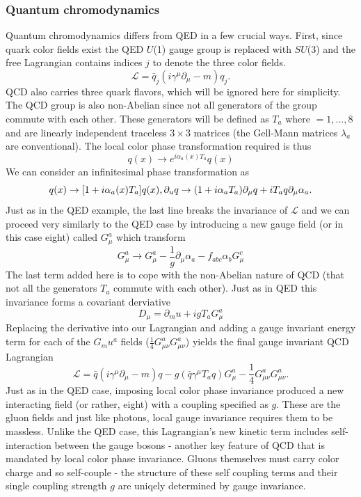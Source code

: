 \subsubsection{Quantum chromodynamics}
Quantum chromodynamics differs from QED in a few crucial ways. First, since quark color fields exist the QED $U$(1) gauge group is replaced with $SU$(3) and the free Lagrangian contains indices $j$ to denote the three color fields. 
\begin{equation}
\mathcal{L} = \bar{q}_j(i\gamma^\mu\partial_\mu - m)q_j.
\end{equation}
QCD also carries three quark flavors, which will be ignored here for simplicity. The QCD group is also non-Abelian since not all generators of the group commute with each other. These generators will be defined as $T_a$ where $=1,...,8$ and are linearly independent traceless $3\times3$ matrices (the Gell-Mann matrices $\lambda_a$ are conventional). The local color phase transformation required is thus 
\begin{equation}
q(x) \rightarrow e^{i\alpha_a(x)T_a}q(x)
\end{equation}
We can consider an infinitesimal phase transformation as 
\begin{equation}
q(x) \rightarrow [1+i\alpha_a(x)T_a]q(x), \\
\partial_uq \rightarrow (1+i\alpha_aT_a)\partial_\mu q + i T_a q \partial_\mu \alpha_a.
\end{equation}
Just as in the QED example, the last line breaks the invariance of $\mathcal{L}$ and we can proceed very similarly to the QED case by introducing a new gauge field (or in this case eight) called $G_\mu^a$ which transform 
\begin{equation}
G_\mu^a \rightarrow G_\mu^a - \frac{1}{g}\partial_\mu\alpha_a - f_{abc}\alpha_b G_\mu^c
\end{equation}
The last term added here is to cope with the non-Abelian nature of QCD (that not all the generators $T_a$ commute with each other). Just as in QED this invariance forms a covariant derviative 
\begin{equation}
D_\mu = \partial_mu + i g T_aG_\mu^a
\end{equation}
Replacing the derivative into our Lagrangian and adding a gauge invariant energy term for each of the $G_mu^a$ fields ($\frac{1}{4}G_{\mu\nu}^aG_{\mu\nu}^a$) yields the final gauge invariant QCD Lagrangian
\begin{equation}
\mathcal{L} = \bar{q}(i\gamma^\mu\partial_\mu - m)q - g(\bar{q}\gamma^\mu T_aq)G_\mu^a-\frac{1}{4}G_{\mu\nu}^aG_{\mu\nu}^a.
\end{equation}
Just as in the QED case, imposing local color phase invariance produced a new interacting field (or rather, eight) with a coupling specified as $g$. These are the gluon fields and just like photons, local gauge invariance requires them to be massless. Unlike the QED case, this Lagrangian's new kinetic term includes self-interaction between the gauge bosons - another key feature of QCD that is mandated by local color phase invariance. Gluons themselves must carry color charge and so self-couple - the structure of these self coupling terms and their single coupling strength $g$ are uniqely determined by gauge invariance. 
